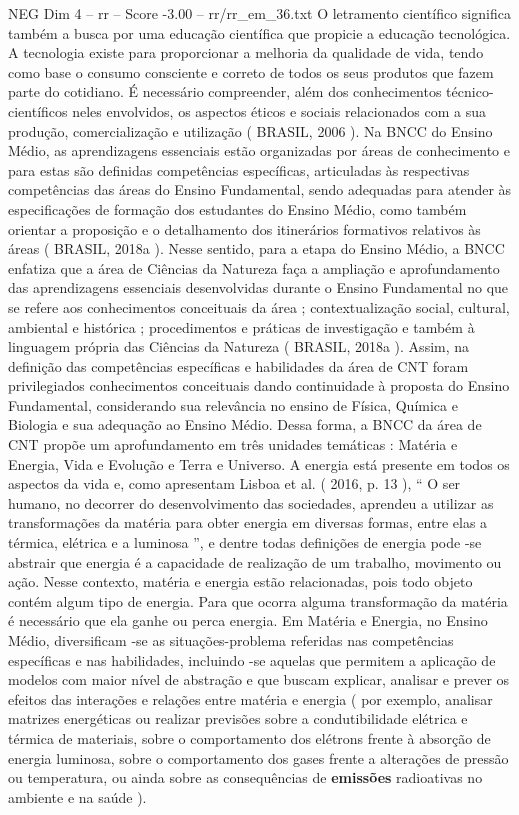 \begin{textsample}{NEG Dim 4 – rr – Score -3.00 – rr/rr\_em\_36.txt}
O letramento científico significa também a busca por uma educação científica que propicie a educação tecnológica.
A tecnologia existe para proporcionar a melhoria da qualidade de vida, tendo como base o consumo consciente e correto de todos os seus produtos que fazem parte do cotidiano.
É necessário compreender, além dos conhecimentos técnico-científicos neles envolvidos, os aspectos éticos e sociais relacionados com a sua produção, comercialização e utilização ( BRASIL, 2006 ).
Na BNCC do Ensino Médio, as aprendizagens essenciais estão organizadas por áreas de conhecimento e para estas são definidas competências específicas, articuladas às respectivas competências das áreas do Ensino Fundamental, sendo adequadas para atender às especificações de formação dos estudantes do Ensino Médio, como também orientar a proposição e o detalhamento dos itinerários formativos relativos às áreas ( BRASIL, 2018a ).
Nesse sentido, para a etapa do Ensino Médio, a BNCC enfatiza que a área de Ciências da Natureza faça a ampliação e aprofundamento das aprendizagens essenciais desenvolvidas durante o Ensino Fundamental no que se refere aos conhecimentos conceituais da área ; contextualização social, cultural, ambiental e histórica ; procedimentos e práticas de investigação e também à linguagem própria das Ciências da Natureza ( BRASIL, 2018a ).
Assim, na definição das competências específicas e habilidades da área de CNT foram privilegiados conhecimentos conceituais dando continuidade à proposta do Ensino Fundamental, considerando sua relevância no ensino de Física, Química e Biologia e sua adequação ao Ensino Médio.
Dessa forma, a BNCC da área de CNT propõe um aprofundamento em três unidades temáticas : Matéria e Energia, Vida e Evolução e Terra e Universo.
A energia está presente em todos os aspectos da vida e, como apresentam Lisboa et al. ( 2016, p. 13 ), “ O ser humano, no decorrer do desenvolvimento das sociedades, aprendeu a utilizar as transformações da matéria para obter energia em diversas formas, entre elas a térmica, elétrica e a luminosa ”, e dentre todas definições de energia pode -se abstrair que energia é a capacidade de realização de um trabalho, movimento ou ação.
Nesse contexto, matéria e energia estão relacionadas, pois todo objeto contém algum tipo de energia.
Para que ocorra alguma transformação da matéria é necessário que ela ganhe ou perca energia.
Em Matéria e Energia, no Ensino Médio, diversificam -se as situações-problema referidas nas competências específicas e nas habilidades, incluindo -se aquelas que permitem a aplicação de modelos com maior nível de abstração e que buscam explicar, analisar e prever os efeitos das interações e relações entre matéria e energia ( por exemplo, analisar matrizes energéticas ou realizar previsões sobre a condutibilidade elétrica e térmica de materiais, sobre o comportamento dos elétrons frente à absorção de energia luminosa, sobre o comportamento dos gases frente a alterações de pressão ou temperatura, ou ainda sobre as consequências de \textbf{emissões} radioativas no ambiente e na saúde ).

\end{textsample}
